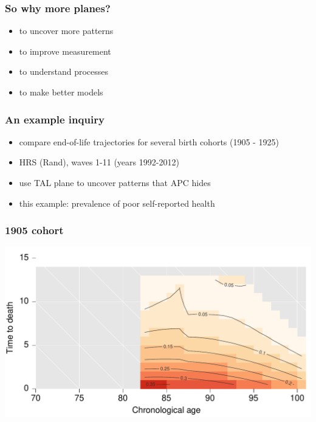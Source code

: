 \documentclass[20pt]{beamer}
\begin{document}

\begin{frame}
\frametitle{So why more planes?}
\normalsize
\begin{itemize}[<+->]
  \item to uncover more patterns
  \item to improve measurement
  \item to understand processes
  \item to make better models
\end{itemize}
\end{frame}


\begin{frame}
\frametitle{An example inquiry}
\normalsize
\begin{itemize}[<+->]
  \item compare end-of-life trajectories for several birth cohorts (1905 - 1925)
  \item HRS (Rand), waves 1-11 (years 1992-2012)
  \item use TAL plane to uncover patterns that APC hides
  \item this example: prevalence of poor self-reported health
\end{itemize}
\end{frame}


\begin{frame}
\frametitle{1905 cohort}
\vspace{-4em}
\begin{center}
\includegraphics[scale=1]{Figures/srhpoor1905.pdf}
\end{center}
\end{frame}
\end{document}
